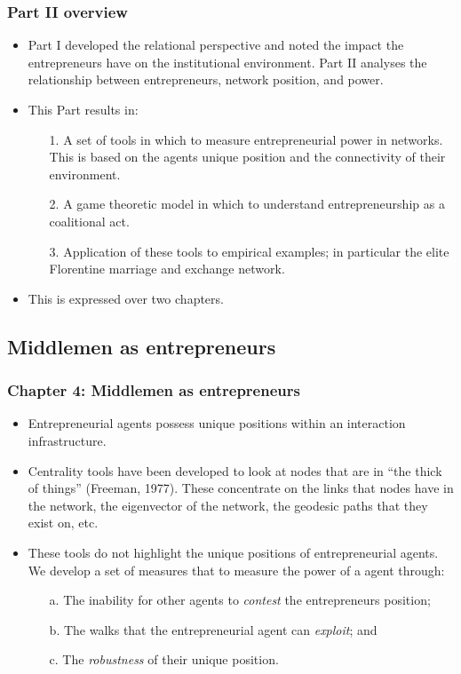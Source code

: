 \documentclass[10pt]{beamer}
\begin{document}
\begin{frame} \frametitle{Part II overview}
\begin{itemize}
\item Part I developed the relational perspective and noted the impact the entrepreneurs have on the institutional environment. Part II analyses the relationship between entrepreneurs, network position, and power.
\medskip
\item This Part results in:
\begin{itemize}
\medskip
\item[1.] A set of tools in which to measure entrepreneurial power in networks. This is based on the agents unique position and the connectivity of their environment.
\medskip
\item[2.] A game theoretic model in which to understand entrepreneurship as a coalitional act.
\medskip
\item[3.] Application of these tools to empirical examples; in particular the elite Florentine marriage and exchange network.
\end{itemize}
\medskip
\item This is expressed over two chapters.
\end{itemize}
\end{frame}

\subsection{Middlemen as entrepreneurs}

\begin{frame} \frametitle{Chapter 4: Middlemen as entrepreneurs}
\begin{itemize}
\item Entrepreneurial agents possess unique positions within an interaction infrastructure.
\medskip
\item Centrality tools have been developed to look at nodes that are in ``the thick of things'' (Freeman, 1977). These concentrate on the links that nodes have in the network, the eigenvector of the network, the geodesic paths that they exist on, etc.
\medskip
\item These tools do not highlight the unique positions of entrepreneurial agents. We develop a set of measures that to measure the power of a agent through:
\begin{itemize}
\medskip
\item[a.] The inability for other agents to \emph{contest} the entrepreneurs position;
\medskip
\item[b.] The walks that the entrepreneurial agent can \emph{exploit}; and
\medskip
\item[c.] The \emph{robustness} of their unique position.
\end{itemize}
\end{itemize}
\end{frame}
\end{document}

